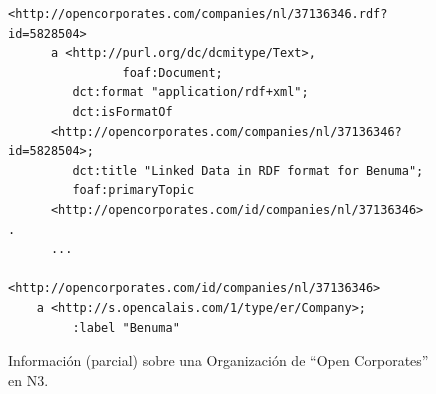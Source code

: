 \begin{figure}[!h]
\begin{center}
\begin{lstlisting}[language=SPARQL]
    <http://opencorporates.com/companies/nl/37136346.rdf?id=5828504>    
      a <http://purl.org/dc/dcmitype/Text>,
                foaf:Document;
         dct:format "application/rdf+xml";
         dct:isFormatOf 
	  <http://opencorporates.com/companies/nl/37136346?id=5828504>;
         dct:title "Linked Data in RDF format for Benuma";
         foaf:primaryTopic 
	  <http://opencorporates.com/id/companies/nl/37136346> .
	  ...
        <http://opencorporates.com/id/companies/nl/37136346>     
	a <http://s.opencalais.com/1/type/er/Company>;
         :label "Benuma" 
\end{lstlisting}
\caption{Información (parcial) sobre una Organización de ``Open Corporates'' en N3.}
\label{figure:open-org}
\end{center}
\end{figure}

\cleardoublepage
